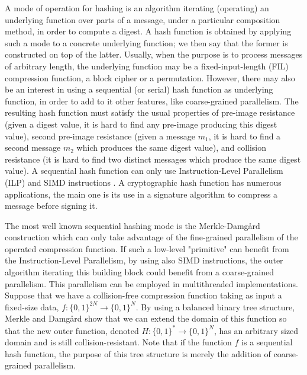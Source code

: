 \documentclass{llncs}
\begin{document}
A mode of operation for hashing is an algorithm iterating (operating)
an underlying function over parts of a message, under a particular composition method, 
in order to compute a digest. 
A hash function is obtained by applying such a mode to a concrete underlying function;
we then
say that the former is constructed on top of the latter.
Usually, when the purpose is to process messages of arbitrary length, the underlying function may be a fixed-input-length (FIL) compression function, 
a block cipher or a permutation. 
However, there may also be an interest in using a sequential (or serial) hash function as underlying function, in order to add to it other features, 
like coarse-grained parallelism.
The resulting hash function must satisfy the usual properties of pre-image resistance (given a digest value, it is hard to find 
any pre-image producing this digest value),
second pre-image resistance (given a message $m_1$, it is hard to find a second message $m_2$ which produces the same digest value),
and collision resistance (it is hard to find two distinct messages which produce the same digest value).
A sequential hash function can only use 
Instruction-Level Parallelism (ILP) and SIMD instructions \cite{GK12a,GK12b}.
A cryptographic hash function has numerous applications, the 
main one is
its use
in a signature algorithm to compress a message before signing it.

The most well known sequential hashing mode is the Merkle-Damgård \cite{Dam90,Mer79} construction
which can only take advantage of the fine-grained parallelism of the operated compression function.
If such a low-level "primitive" can benefit from the Instruction-Level Parallelism, by using also
SIMD instructions, the outer algorithm iterating this building block could benefit from a coarse-grained 
parallelism. This parallelism can be employed in multithreaded implementations.
Suppose that we have a collision-free compression function taking as input
a fixed-size data, $f : \{0,1\}^{2N} \rightarrow \{0,1\}^N$. By using a balanced binary tree structure, 
Merkle and Damgård \cite{Dam90,Mer80} show that we can extend the domain 
of this function so that the new outer function, denoted
$H : \{0,1\}^* \rightarrow \{0,1\}^N$, has an arbitrary sized domain and is still collision-resistant.
Note that if the function $f$ is a sequential hash function, the purpose of this tree structure is merely the addition 
of coarse-grained parallelism.
\end{document}
